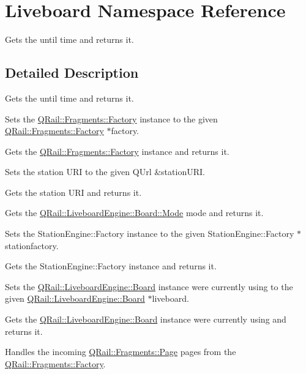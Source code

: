 \hypertarget{namespaceLiveboard}{}\section{Liveboard Namespace Reference}
\label{namespaceLiveboard}


Gets the until time and returns it.  




\subsection{Detailed Description}
Gets the until time and returns it. 

Sets the \mbox{\hyperlink{classQRail_1_1Fragments_1_1Factory}{Q\+Rail\+::\+Fragments\+::\+Factory}} instance to the given \mbox{\hyperlink{classQRail_1_1Fragments_1_1Factory}{Q\+Rail\+::\+Fragments\+::\+Factory}} $\ast$factory.

Gets the \mbox{\hyperlink{classQRail_1_1Fragments_1_1Factory}{Q\+Rail\+::\+Fragments\+::\+Factory}} instance and returns it.

Sets the station U\+RI to the given Q\+Url \&station\+U\+RI.

Gets the station U\+RI and returns it.

Gets the \mbox{\hyperlink{classQRail_1_1LiveboardEngine_1_1Board_a0ab6d318f405895f62c6e98cb2d86c6e}{Q\+Rail\+::\+Liveboard\+Engine\+::\+Board\+::\+Mode}} mode and returns it.

Sets the Station\+Engine\+::\+Factory instance to the given Station\+Engine\+::\+Factory $\ast$stationfactory.

Gets the Station\+Engine\+::\+Factory instance and returns it.

Sets the \mbox{\hyperlink{classQRail_1_1LiveboardEngine_1_1Board}{Q\+Rail\+::\+Liveboard\+Engine\+::\+Board}} instance we\textquotesingle{}re currently using to the given \mbox{\hyperlink{classQRail_1_1LiveboardEngine_1_1Board}{Q\+Rail\+::\+Liveboard\+Engine\+::\+Board}} $\ast$liveboard.

Gets the \mbox{\hyperlink{classQRail_1_1LiveboardEngine_1_1Board}{Q\+Rail\+::\+Liveboard\+Engine\+::\+Board}} instance we\textquotesingle{}re currently using and returns it.

Handles the incoming \mbox{\hyperlink{classQRail_1_1Fragments_1_1Page}{Q\+Rail\+::\+Fragments\+::\+Page}} pages from the \mbox{\hyperlink{classQRail_1_1Fragments_1_1Factory}{Q\+Rail\+::\+Fragments\+::\+Factory}}.

